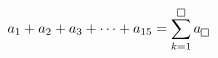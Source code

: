 $a_1+a_2+a_3+\cdots+a_{15}=\displaystyle\sum_{k=1}^{\text{\setlength{\fboxsep}{0.8pt}\framebox[5.6pt]{\rule{0pt}{3.2pt}}}} a_{\text{\setlength{\fboxsep}{0.8pt}\framebox[5.6pt]{\rule{0pt}{3.2pt}}}}$
